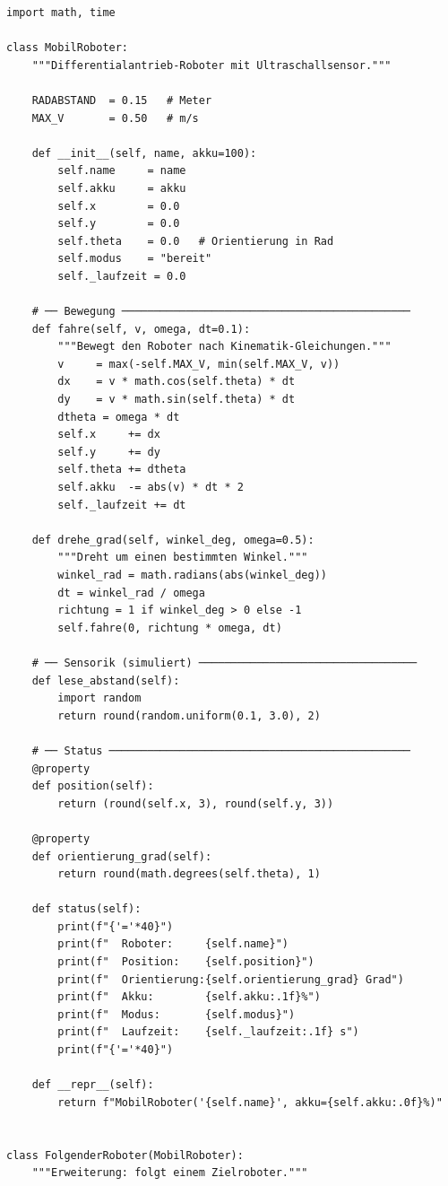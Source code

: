\begin{lstlisting}
import math, time

class MobilRoboter:
    """Differentialantrieb-Roboter mit Ultraschallsensor."""

    RADABSTAND  = 0.15   # Meter
    MAX_V       = 0.50   # m/s

    def __init__(self, name, akku=100):
        self.name     = name
        self.akku     = akku
        self.x        = 0.0
        self.y        = 0.0
        self.theta    = 0.0   # Orientierung in Rad
        self.modus    = "bereit"
        self._laufzeit = 0.0

    # ── Bewegung ─────────────────────────────────────────────
    def fahre(self, v, omega, dt=0.1):
        """Bewegt den Roboter nach Kinematik-Gleichungen."""
        v     = max(-self.MAX_V, min(self.MAX_V, v))
        dx    = v * math.cos(self.theta) * dt
        dy    = v * math.sin(self.theta) * dt
        dtheta = omega * dt
        self.x     += dx
        self.y     += dy
        self.theta += dtheta
        self.akku  -= abs(v) * dt * 2
        self._laufzeit += dt

    def drehe_grad(self, winkel_deg, omega=0.5):
        """Dreht um einen bestimmten Winkel."""
        winkel_rad = math.radians(abs(winkel_deg))
        dt = winkel_rad / omega
        richtung = 1 if winkel_deg > 0 else -1
        self.fahre(0, richtung * omega, dt)

    # ── Sensorik (simuliert) ──────────────────────────────────
    def lese_abstand(self):
        import random
        return round(random.uniform(0.1, 3.0), 2)

    # ── Status ───────────────────────────────────────────────
    @property
    def position(self):
        return (round(self.x, 3), round(self.y, 3))

    @property
    def orientierung_grad(self):
        return round(math.degrees(self.theta), 1)

    def status(self):
        print(f"{'='*40}")
        print(f"  Roboter:     {self.name}")
        print(f"  Position:    {self.position}")
        print(f"  Orientierung:{self.orientierung_grad} Grad")
        print(f"  Akku:        {self.akku:.1f}%")
        print(f"  Modus:       {self.modus}")
        print(f"  Laufzeit:    {self._laufzeit:.1f} s")
        print(f"{'='*40}")

    def __repr__(self):
        return f"MobilRoboter('{self.name}', akku={self.akku:.0f}%)"


class FolgenderRoboter(MobilRoboter):
    """Erweiterung: folgt einem Zielroboter."""


\end{lstlisting}
